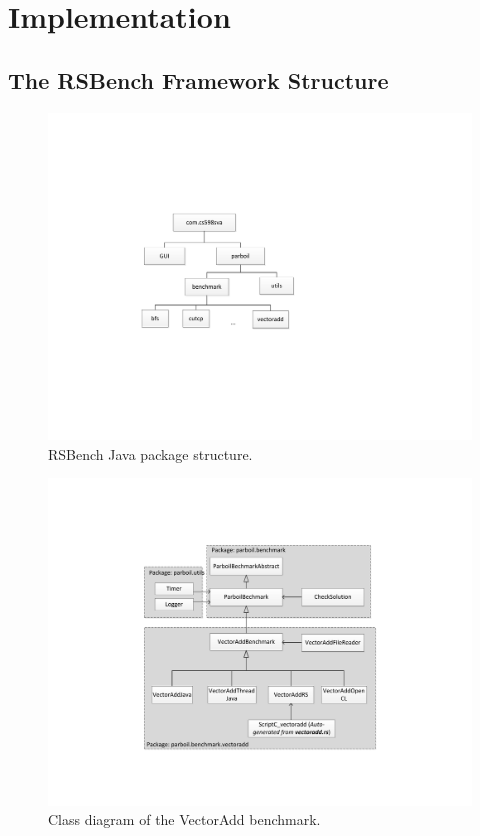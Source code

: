 \section{Implementation}

\subsection{The RSBench Framework Structure}

\begin{figure}[t!]
\centering
\includegraphics[scale=0.65]{figs/package_diagram.pdf}
\caption{RSBench Java package structure.}
\label{fig:package_structure}
\centering
\end{figure}


\begin{figure}[t!]
\centering
\includegraphics[scale=0.5]{figs/vectoradd_class_diagram.pdf}
\caption{Class diagram of the VectorAdd benchmark.}
\label{fig:class_diagram}
\centering
\end{figure}

